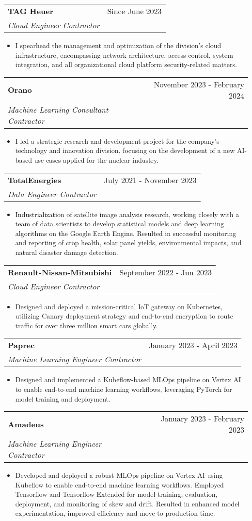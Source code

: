 \documentclass[letterpaper,11pt]{article}
\makeatletter
\newcommand{\resumeItem}[1]{
  \item\small{#1 \vspace{-2pt}}
}
\newcommand{\resumeSubheading}[3]{
  \vspace{-1pt}\item
    \begin{tabular*}{0.97\textwidth}[t]{l@{\extracolsep{\fill}}r}
      \textbf{#1} & #2 \\
      \textit{\small #3} \\
    \end{tabular*}\vspace{-5pt}
}
\newcommand{\resumeItemListStart}{\begin{itemize}}
\newcommand{\resumeItemListEnd}{\end{itemize}\vspace{-5pt}}
\makeatother
\begin{document}
\resumeSubheading{TAG Heuer}
{Since June 2023}
{Cloud Engineer Contractor}
\resumeItemListStart{}
\resumeItem{
	I spearhead the management and optimization of the division's cloud
	infrastructure, encompassing network architecture, access control, system
	integration, and all organizational cloud platform security-related matters.
}
\resumeItemListEnd{}


\resumeSubheading{Orano}
{November 2023 - February 2024}
{Machine Learning Consultant Contractor}
\resumeItemListStart{}
\resumeItem{
	I led a strategic research and development project for the company's
	technology and innovation division, focusing on the development of a new
	AI-based use-cases applied for the nuclear industry.
}
\resumeItemListEnd{}


\resumeSubheading{TotalEnergies}
{July 2021 - November 2023}
{Data Engineer Contractor}
\resumeItemListStart{}
\resumeItem{
	Industrialization of satellite image analysis research, working closely
	with a team of data scientists to develop statistical models and deep learning
	algorithms on the Google Earth Engine. Resulted in successful monitoring and
	reporting of crop health, solar panel yields, environmental impacts, and
	natural disaster damage detection.
}
\resumeItemListEnd{}


\resumeSubheading{Renault-Nissan-Mitsubishi}
{September 2022 - Jun 2023}
{Cloud Engineer Contractor}
\resumeItemListStart{}
\resumeItem{
	Designed and deployed a mission-critical IoT gateway on Kubernetes, utilizing
	Canary deployment strategy and end-to-end encryption to route traffic for over
	three million smart cars globally.
}
\resumeItemListEnd{}


\resumeSubheading{Paprec}
{January 2023 - April 2023}
{Machine Learning Engineer Contractor}
\resumeItemListStart{}
\resumeItem{
	Designed and implemented a Kubeflow-based MLOps pipeline on Vertex AI to enable
	end-to-end machine learning workflows, leveraging PyTorch for model training and
	deployment.
}
\resumeItemListEnd{}


\resumeSubheading{Amadeus}
{January 2023 - February 2023}
{Machine Learning Engineer Contractor}
\resumeItemListStart{}
\resumeItem{
	Developed and deployed a robust MLOps pipeline on Vertex AI using Kubeflow to
	enable end-to-end machine learning workflows. Employed Tensorflow and Tensorflow
	Extended for model training, evaluation, deployment, and monitoring of skew and
	drift. Resulted in enhanced model experimentation, improved efficiency and
	move-to-production time.
}
\resumeItemListEnd{}
\end{document}
